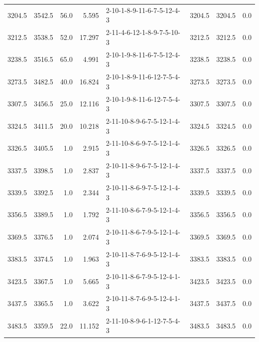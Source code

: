 \begin{tabular}{rrrrlrrr}
 3204.5 &  3542.5 &           56.0 &              5.595 &  2-10-1-8-9-11-6-7-5-12-4-3 &        3204.5 &          3204.5 &       0.0 \\
 3212.5 &  3538.5 &           52.0 &             17.297 &  2-11-4-6-12-1-8-9-7-5-10-3 &        3212.5 &          3212.5 &       0.0 \\
 3238.5 &  3516.5 &           65.0 &              4.991 &  2-10-1-9-8-11-6-7-5-12-4-3 &        3238.5 &          3238.5 &       0.0 \\
 3273.5 &  3482.5 &           40.0 &             16.824 &  2-10-1-8-9-11-6-12-7-5-4-3 &        3273.5 &          3273.5 &       0.0 \\
 3307.5 &  3456.5 &           25.0 &             12.116 &  2-10-1-9-8-11-6-12-7-5-4-3 &        3307.5 &          3307.5 &       0.0 \\
 3324.5 &  3411.5 &           20.0 &             10.218 &  2-11-10-8-9-6-7-5-12-1-4-3 &        3324.5 &          3324.5 &       0.0 \\
 3326.5 &  3405.5 &            1.0 &              2.915 &  2-11-10-8-6-9-7-5-12-1-4-3 &        3326.5 &          3326.5 &       0.0 \\
 3337.5 &  3398.5 &            1.0 &              2.837 &  2-10-11-8-9-6-7-5-12-1-4-3 &        3337.5 &          3337.5 &       0.0 \\
 3339.5 &  3392.5 &            1.0 &              2.344 &  2-10-11-8-6-9-7-5-12-1-4-3 &        3339.5 &          3339.5 &       0.0 \\
 3356.5 &  3389.5 &            1.0 &              1.792 &  2-11-10-8-6-7-9-5-12-1-4-3 &        3356.5 &          3356.5 &       0.0 \\
 3369.5 &  3376.5 &            1.0 &              2.074 &  2-10-11-8-6-7-9-5-12-1-4-3 &        3369.5 &          3369.5 &       0.0 \\
 3383.5 &  3374.5 &            1.0 &              1.963 &  2-10-11-8-7-6-9-5-12-1-4-3 &        3383.5 &          3383.5 &       0.0 \\
 3423.5 &  3367.5 &            1.0 &              5.665 &  2-10-11-8-6-7-9-5-12-4-1-3 &        3423.5 &          3423.5 &       0.0 \\
 3437.5 &  3365.5 &            1.0 &              3.622 &  2-10-11-8-7-6-9-5-12-4-1-3 &        3437.5 &          3437.5 &       0.0 \\
 3483.5 &  3359.5 &           22.0 &             11.152 &  2-11-10-8-9-6-1-12-7-5-4-3 &        3483.5 &          3483.5 &       0.0 \\

\end{tabular}
